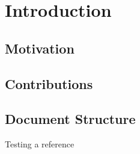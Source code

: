 \chapter{Introduction} \label{chap:introduction}

\section{Motivation}
\lipsum

\section{Contributions}

\section{Document Structure}
Testing a reference~\cite{VanZaen2019}
